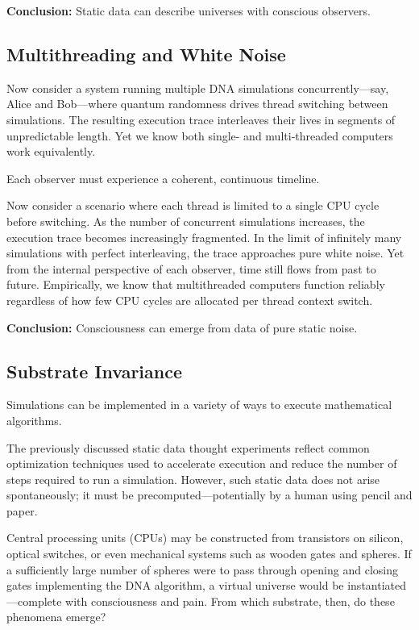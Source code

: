 \documentclass[11pt]{article}
\begin{document}
\textbf{Conclusion:} Static data can describe universes with conscious observers.



\subsection{Multithreading and White Noise}

Now consider a system running multiple DNA simulations concurrently—say, Alice and Bob—where quantum randomness drives thread switching between simulations. The resulting execution trace interleaves their lives in segments of unpredictable length. Yet we know both single- and multi-threaded computers work equivalently.

Each observer must experience a coherent, continuous timeline.

Now consider a scenario where each thread is limited to a single CPU cycle before switching. As the number of concurrent simulations increases, the execution trace becomes increasingly fragmented. In the limit of infinitely many simulations with perfect interleaving, the trace approaches pure white noise. Yet from the internal perspective of each observer, time still flows from past to future. Empirically, we know that multithreaded computers function reliably regardless of how few CPU cycles are allocated per thread context switch.

\textbf{Conclusion:} Consciousness can emerge from data of pure static noise.


\subsection{Substrate Invariance}

Simulations can be implemented in a variety of ways to execute mathematical algorithms.

The previously discussed static data thought experiments reflect common optimization techniques used to accelerate execution and reduce the number of steps required to run a simulation. However, such static data does not arise spontaneously; it must be precomputed—potentially by a human using pencil and paper.

Central processing units (CPUs) may be constructed from transistors on silicon, optical switches, or even mechanical systems such as wooden gates and spheres. If a sufficiently large number of spheres were to pass through opening and closing gates implementing the DNA algorithm, a virtual universe would be instantiated—complete with consciousness and pain. From which substrate, then, do these phenomena emerge?
\end{document}
